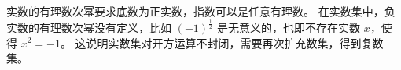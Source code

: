 \vspace{1em}
\begin{note}
    实数的有理数次幂要求底数为正实数，指数可以是任意有理数。
    在实数集中，负实数的有理数次幂没有定义，比如 $(-1)^{\frac{1}{2}}$ 是无意义的，也即不存在实数 $x$，使得 $x^2 = -1$。
    这说明实数集对开方运算不封闭，需要再次扩充数集，得到复数集。
\end{note}

\newpage